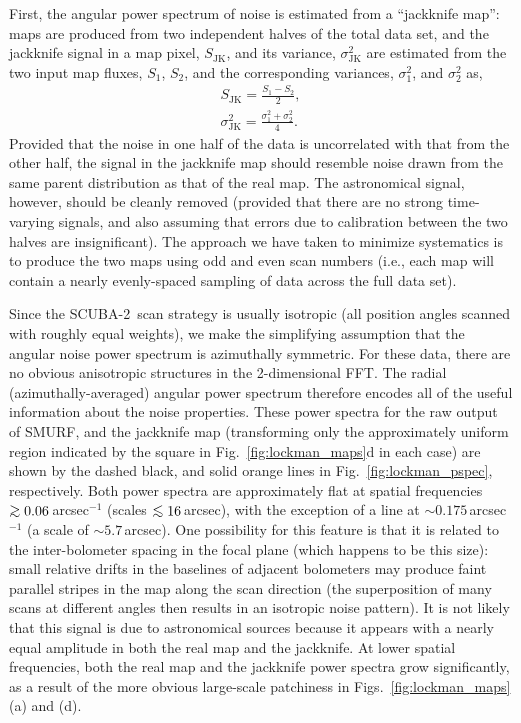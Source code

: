 \documentclass[useAMS,usenatbib,nofootinbib]{mn2e}
\newcommand{\scuba}{SCUBA-2}
\def\lsim{\mathrel{\lower2.5pt\vbox{\lineskip=0pt\baselineskip=0pt
          \hbox{$<$}\hbox{$\sim$}}}}
\def\gsim{\mathrel{\lower2.5pt\vbox{\lineskip=0pt\baselineskip=0pt
          \hbox{$>$}\hbox{$\sim$}}}}
\begin{document}
First, the angular power spectrum of noise is estimated from a
``jackknife map'': maps are produced from two independent halves of
the total data set, and the jackknife signal in a map pixel,
$S_\mathrm{JK}$, and its variance, $\sigma^2_\mathrm{JK}$ are
estimated from the two input map fluxes, $S_1$, $S_2$, and the
corresponding variances, $\sigma^2_1$, and $\sigma^2_2$ as,
%
\begin{eqnarray}
S_\mathrm{JK} = \frac{S_1 - S_2}{2}, \\
\sigma^2_\mathrm{JK} = \frac{\sigma^2_1 + \sigma^2_2}{4}.
\end{eqnarray}
%
Provided that the noise in one half of the data is uncorrelated with
that from the other half, the signal in the jackknife map should
resemble noise drawn from the same parent distribution as that of the
real map. The astronomical signal, however, should be cleanly removed
(provided that there are no strong time-varying signals, and also
assuming that errors due to calibration between the two halves are
insignificant). The approach we have taken to minimize systematics is
to produce the two maps using odd and even scan numbers (i.e., each
map will contain a nearly evenly-spaced sampling of data across the
full data set).

Since the \scuba\ scan strategy is usually isotropic (all position
angles scanned with roughly equal weights), we make the simplifying
assumption that the angular noise power spectrum is azimuthally
symmetric. For these data, there are no obvious anisotropic structures
in the 2-dimensional FFT. The radial (azimuthally-averaged) angular
power spectrum therefore encodes all of the useful information about
the noise properties. These power spectra for the raw output of SMURF,
and the jackknife map (transforming only the approximately uniform
region indicated by the square in Fig.~\ref{fig:lockman_maps}d in each
case) are shown by the dashed black, and solid orange lines in
Fig.~\ref{fig:lockman_pspec}, respectively. Both power spectra are
approximately flat at spatial frequencies $\gsim 0.06$\,arcsec$^{-1}$
(scales $\lsim16$\,arcsec), with the exception of a line at
$\sim0.175$\,arcsec$^{-1}$ (a scale of $\sim5.7$\,arcsec). One
possibility for this feature is that it is related to the
inter-bolometer spacing in the focal plane (which happens to be this
size): small relative drifts in the baselines of adjacent bolometers
may produce faint parallel stripes in the map along the scan direction
(the superposition of many scans at different angles then results in
an isotropic noise pattern). It is not likely that this signal is due
to astronomical sources because it appears with a nearly equal
amplitude in both the real map and the jackknife.  At lower spatial
frequencies, both the real map and the jackknife power spectra grow
significantly, as a result of the more obvious large-scale patchiness
in Figs.~\ref{fig:lockman_maps}(a) and (d).
\end{document}
